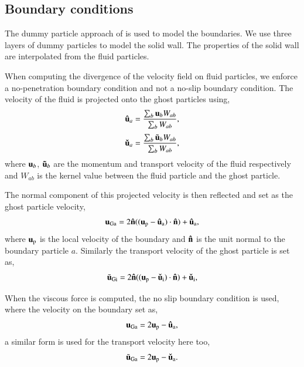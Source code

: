 
\subsection{Boundary conditions}
The dummy particle approach of \cite{Adami2012} is used to model the
boundaries. We use three layers of dummy particles to model the solid wall.
The properties of the solid wall are interpolated from the fluid particles.

When computing the divergence of the velocity field on fluid particles, we
enforce a no-penetration boundary condition and not a no-slip boundary
condition. The velocity of the fluid is projected onto the ghost particles
using,
\begin{equation}
  \label{eq:v-ghost}
  \mathbf{\hat{u}}_a = \frac{\sum_b\mathbf{u}_b W_{ab}}{\sum_b W_{ab}},
\end{equation}
\begin{equation}
  \label{eq:v-hat-ghost}
  \mathbf{\check{u}}_a = \frac{\sum_b\tilde{\mathbf{u}}_b W_{ab}}{\sum_b W_{ab}},
\end{equation}
where $\mathbf{u}_b$, $\mathbf{\tilde{u}}_b$ are the momentum and transport velocity
of the fluid respectively and $W_{ab}$ is the kernel value between the fluid
particle and the ghost particle.

The normal component of this projected velocity is then reflected and set as
the ghost particle velocity,
\begin{equation}
  \label{eq:free-slip-bc-u}
  \mathbf{u}_{\text{Ga}} = 2 \mathbf{\hat{n}}((\mathbf{u}_{\text{p}} - \mathbf{\hat{u}}_{\text{a}})\cdot \mathbf{\hat{n}}) + \mathbf{\hat{u}}_{\text{a}},
\end{equation}
where $\mathbf{u}_{\text{p}}$ is the local velocity of the boundary and
$\mathbf{\hat{n}}$ is the unit normal to the boundary particle $a$. Similarly the
transport velocity of the ghost particle is set as,
\begin{equation}
  \label{eq:free-slip-bc-u}
  \tilde{\mathbf{u}}_{\text{Gi}} = 2 \mathbf{\hat{n}}((\mathbf{u}_{\text{p}} - \mathbf{\check{u}}_{\text{i}})\cdot \mathbf{\hat{n}}) + \mathbf{\check{u}}_{\text{i}},
\end{equation}

When the viscous force is computed, the no slip boundary condition is used,
where the velocity on the boundary set as,
\begin{equation}
  \label{eq:no-slip-bc-u}
  \mathbf{u}_{\text{Ga}} = 2 \mathbf{u}_{\text{p}} - \mathbf{\hat{u}}_{\text{a}},
\end{equation}
a similar form is used for the transport velocity here too,
\begin{equation}
  \label{eq:no-slip-bc-uhat}
  \tilde{\mathbf{u}}_{\text{Ga}} = 2 \mathbf{u}_{\text{p}} - \mathbf{\check{u}}_{\text{a}}.
\end{equation}

